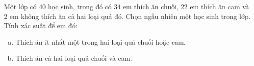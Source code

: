 \begin{baitap}%
	Một lớp có $40$ học sinh, trong đó có $34$ em thích ăn chuối, $22$ em thích ăn cam và $2$ em không thích ăn cả hai loại quả đó. Chọn ngẫu nhiên một học sinh trong lớp. Tính xác suất để em đó:
	\begin{enumerate}[a)]
		\item Thích ăn ít nhất một trong hai loại quả chuối hoặc cam.
		\item Thích ăn cả hai loại quả chuối và cam.
	\end{enumerate}
\end{baitap}

